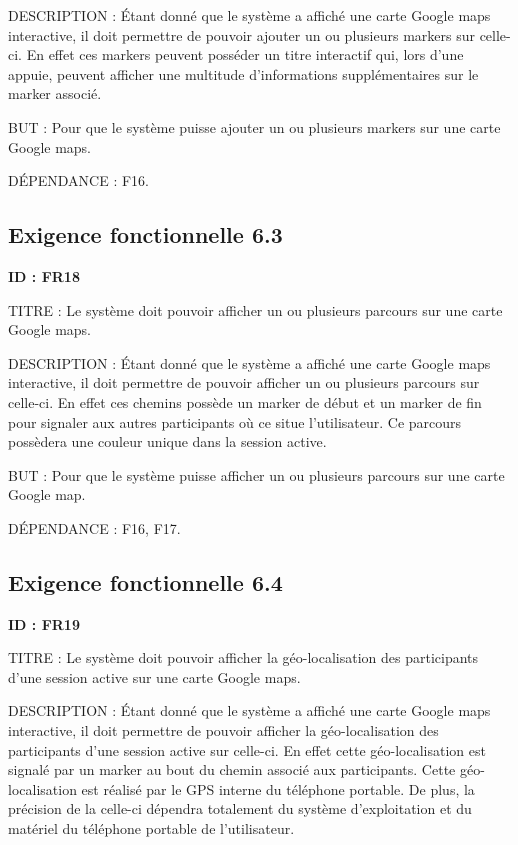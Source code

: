 \documentclass[titlepage, 12pt]{report}
\begin{document}
DESCRIPTION : Étant donné que le système a affiché une carte Google maps interactive, il doit permettre de pouvoir ajouter un ou plusieurs markers sur celle-ci. En effet ces markers peuvent posséder un titre interactif qui, lors d'une appuie, peuvent afficher une multitude d'informations supplémentaires sur le marker associé.

BUT : Pour que le système puisse ajouter un ou plusieurs markers sur une carte Google maps.

DÉPENDANCE : F16.

\subsection{Exigence fonctionnelle 6.3}

\textbf{ID : FR18}

TITRE : Le système doit pouvoir afficher un ou plusieurs parcours sur une carte Google maps.

DESCRIPTION : Étant donné que le système a affiché une carte Google maps interactive, il doit permettre de pouvoir afficher un ou plusieurs parcours sur celle-ci. En effet ces chemins possède un marker de début et un marker de fin pour signaler aux autres participants où ce situe l'utilisateur. Ce parcours possèdera une couleur unique dans la session active.

BUT : Pour que le système puisse afficher un ou plusieurs parcours sur une carte Google map.

DÉPENDANCE : F16, F17.

\subsection{Exigence fonctionnelle 6.4}

\textbf{ID : FR19}

TITRE : Le système doit pouvoir afficher la géo-localisation des participants d'une session active sur une carte Google maps.

DESCRIPTION : Étant donné que le système a affiché une carte Google maps interactive, il doit permettre de pouvoir afficher la géo-localisation des participants d'une session active sur celle-ci. En effet cette géo-localisation est signalé par un marker au bout du chemin associé aux participants. Cette géo-localisation est réalisé par le GPS interne du téléphone portable. De plus, la précision de la celle-ci dépendra totalement du système d'exploitation et du matériel du téléphone portable de l'utilisateur. 
\end{document}
